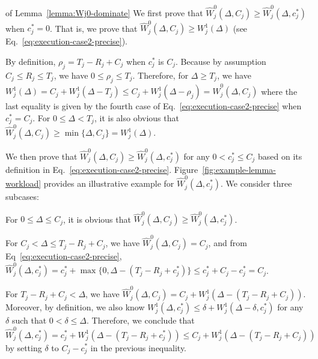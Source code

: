 \begin{appProof}{of Lemma~\ref{lemma:Wj0-dominate}}
  We first prove that $\widehat{W}_j^0(\Delta, C_j) \geq \widehat{W}_j^0(\Delta, c_j^*)$ when $c_j^* =0$. That is, we prove that $\widehat{W}_j^0(\Delta, C_j) \geq W_j^1(\Delta)$ (see Eq.~\eqref{eq:execution-case2-precise}). 
  
  By definition, $\rho_j=T_j-R_j+C_j$ when $c_j^*$ is $C_j$. Because by
 assumption $C_j \leq R_j \leq T_j$, we have $0 \leq \rho_j \leq
 T_j$. Therefore, for $\Delta \geq T_j$, we have $W_j^1(\Delta) = C_j
 + W_j^1(\Delta-T_j) \leq C_j + W_j^1(\Delta - \rho_j) =
 \widehat{W}_j^0(\Delta, C_j)$ where the last equality is given by the fourth case of Eq.~\eqref{eq:execution-case2-precise} when $c_j^* = C_j$. For $0 \leq \Delta < T_j$, it is also
 obvious that $\widehat{W}_j^0(\Delta, C_j) \geq \min\{\Delta, C_j\}
 = W_j^1(\Delta)$.

 We then prove that $\widehat{W}_j^0(\Delta, C_j) \geq
 \widehat{W}_j^0(\Delta, c_j^*)$ for any $0 < c_j^* \leq C_j$ based on its definition in Eq.~\eqref{eq:execution-case2-precise}. 
Figure~\ref{fig:example-lemma-workload} provides an illustrative example for $\widehat{W}_j^0(\Delta, c_j^*)$. We consider three subcases:
 \begin{compactitem}
 \item For $0 \leq \Delta \leq C_j$, it is obvious that
   $\widehat{W}_j^0(\Delta, C_j) \geq \widehat{W}_j^0(\Delta,
   c_j^*)$.
 \item For $C_j < \Delta \leq T_j-R_j+C_j$, we have
   $\widehat{W}_j^0(\Delta, C_j) = C_j$, and from Eq~\eqref{eq:execution-case2-precise},
   $\widehat{W}_j^0(\Delta, c_j^*) = c_j^* + \max\{0,
   \Delta-(T_j-R_j+c_j^*)\} \leq c_j^* + C_j - c_j^* = C_j$.

 \item For $T_j-R_j+C_j < \Delta$, we have $\widehat{W}_j^0(\Delta,
   C_j) = C_j + W_j^1(\Delta - (T_j-R_j+C_j))$.  Moreover, by
   definition, we also know $W_j^1(\Delta, c_j^*) \leq
   \delta+W_j^1(\Delta-\delta, c_j^*)$ for any $\delta$ such that $0 < \delta \leq
   \Delta$. Therefore, we conclude that
   $\widehat{W}_j^0(\Delta, c_j^*) = c_j^* + W_j^1(\Delta -
   (T_j-R_j+c_j^*)) \leq C_j + W_j^1(\Delta - (T_j-R_j+C_j))$ by
   setting $\delta$ to $C_j - c_j^*$ in the previous inequality.
 \end{compactitem}
\end{appProof}


